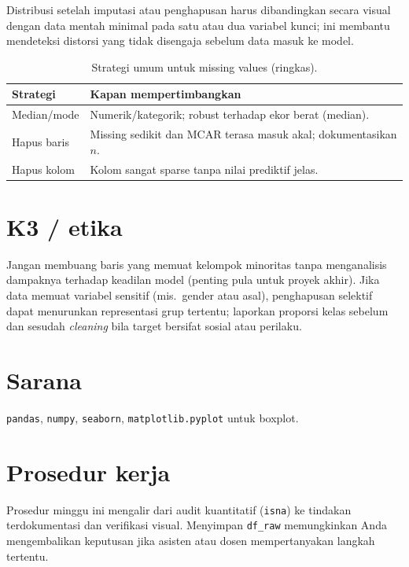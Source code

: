 \documentclass[../main.tex]{subfiles}
\begin{document}
Distribusi setelah imputasi atau penghapusan harus dibandingkan secara visual dengan data mentah minimal pada satu atau dua variabel kunci; ini membantu mendeteksi distorsi yang tidak disengaja sebelum data masuk ke model.



\begin{table}[htbp]
\centering
\caption{Strategi umum untuk missing values (ringkas).}
\label{tab:strategi-missing}
\begin{tabular}{@{}p{3.2cm}p{9.5cm}@{}}
\toprule
\textbf{Strategi} & \textbf{Kapan mempertimbangkan} \\
\midrule
Median/mode & Numerik/kategorik; robust terhadap ekor berat (median). \\
Hapus baris & Missing sedikit dan MCAR terasa masuk akal; dokumentasikan $n$. \\
Hapus kolom & Kolom sangat sparse tanpa nilai prediktif jelas. \\
\bottomrule
\end{tabular}
\end{table}

\section{K3 / etika}

Jangan membuang baris yang memuat kelompok minoritas tanpa menganalisis dampaknya terhadap keadilan model (penting pula untuk proyek akhir).
Jika data memuat variabel sensitif (mis.\ gender atau asal), penghapusan selektif dapat menurunkan representasi grup tertentu; laporkan proporsi kelas sebelum dan sesudah \textit{cleaning} bila target bersifat sosial atau perilaku.

\section{Sarana}

\texttt{pandas}, \texttt{numpy}, \texttt{seaborn}, \texttt{matplotlib.pyplot} untuk boxplot.

\section{Prosedur kerja}

Prosedur minggu ini mengalir dari audit kuantitatif (\texttt{isna}) ke tindakan terdokumentasi dan verifikasi visual. Menyimpan \texttt{df\_raw} memungkinkan Anda mengembalikan keputusan jika asisten atau dosen mempertanyakan langkah tertentu.
\end{document}
